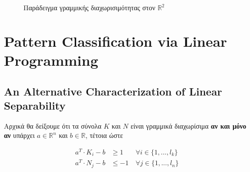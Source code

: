 \documentclass[12pt]{article}
\newcommand{\R}{\mathbb{R}}
\begin{document}
\begin{figure}[hp]
    \centering
    \qquad
    \caption{Παράδειγμα γραμμικής διαχωρισιμότητας στον \( \R^2 \)}
\end{figure}

\pagebreak

\section{Pattern Classification via Linear Programming}

\subsection{An Alternative Characterization of Linear Separability}

Αρχικά θα δείξουμε ότι τα σύνολα \( K \) και \( N \) είναι γραμμικά διαχωρίσιμα
\textbf{αν και μόνο αν} υπάρχει \(a \in \R^{n}\) και \(b \in \R\),
τέτοια ώστε

\begin{align*}
    a^{T} \cdot K_{i} -b & \geq 1 & \forall i \in \{1,...,l_{k}\} \\
    a^{T} \cdot N_{j} - b & \leq -1\ & \forall j \in \{1,...,l_{n}\}
\end{align*}
\end{document}
